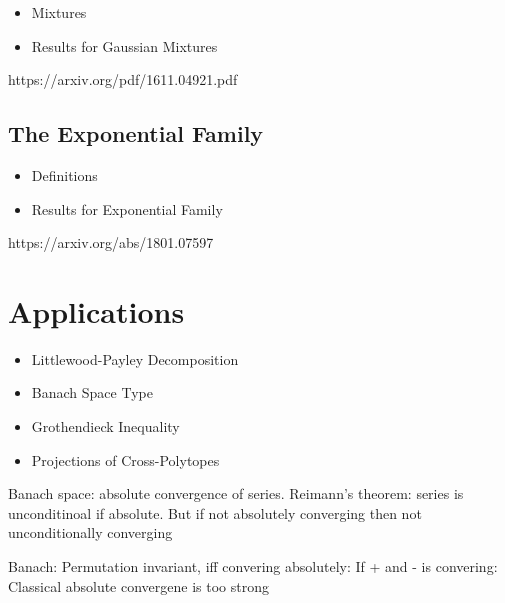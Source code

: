 \documentclass[10pt]{article}
\newcommand{\1}{\textbf{1}}
\theoremstyle{remark}
\theoremstyle{definition}
\begin{document}
\begin{itemize}
	\item Mixtures
	\item Results for Gaussian Mixtures
\end{itemize}

https://arxiv.org/pdf/1611.04921.pdf

\subsection{The Exponential Family}

\begin{itemize}
	\item Definitions
	\item Results for Exponential Family
\end{itemize}

https://arxiv.org/abs/1801.07597

\section{Applications}

\begin{itemize}
	\item Littlewood-Payley Decomposition
	\item Banach Space Type
	\item Grothendieck Inequality
	\item Projections of Cross-Polytopes
\end{itemize}

Banach space: absolute convergence of series. 
	Reimann's theorem: series is unconditinoal if absolute. But if not absolutely converging then not unconditionally converging

Banach: Permutation invariant, iff convering absolutely: If + and - is convering: Classical absolute convergene is too strong
\end{document}
